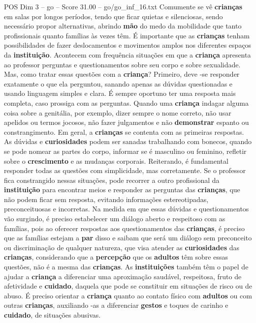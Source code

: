 \begin{textsample}{POS Dim 3 – go – Score 31.00 – go/go\_inf\_16.txt}
Comumente se vê \textbf{crianças} em salas por longos períodos, tendo que ficar quietas e silenciosas, sendo necessário propor alternativas, abrindo \textbf{mão} do medo da mobilidade que tanto profissionais quanto famílias às vezes têm.
É importante que as \textbf{crianças} tenham possibilidades de fazer deslocamentos e movimentos amplos nos diferentes espaços da \textbf{instituição}.
Acontecem com frequência situações em que a \textbf{criança} apresenta ao professor perguntas e questionamentos sobre seu corpo e sobre sexualidade.
Mas, como tratar essas questões com a \textbf{criança}?
Primeiro, deve -se responder exatamente o que ela perguntou, sanando apenas as dúvidas questionadas e usando linguagem simples e clara.
É sempre oportuno ter uma resposta mais completa, caso prossiga com as perguntas.
Quando uma \textbf{criança} indagar alguma coisa sobre a genitália, por exemplo, dizer sempre o nome correto, não usar apelidos ou termos jocosos, não fazer julgamentos e não \textbf{demonstrar} espanto ou constrangimento.
Em geral, a \textbf{crianças} se contenta com as primeiras respostas.
As dúvidas e \textbf{curiosidades} podem ser sanadas trabalhando com bonecos, quando se pode nomear as partes do corpo, informar se é masculino ou feminino, refletir sobre o \textbf{crescimento} e as mudanças corporais.
Reiterando, é fundamental responder todas as questões com simplicidade, mas corretamente.
Se o professor fica constrangido nessas situações, pode recorrer a outro profissional da \textbf{instituição} para encontrar meios e responder as perguntas das \textbf{crianças}, que não podem ficar sem resposta, evitando informações estereotipadas, preconceituosas e incorretas.
Na medida em que essas dúvidas e questionamentos vão surgindo, é preciso estabelecer um diálogo aberto e respeitoso com as famílias, pois ao oferecer respostas aos questionamentos das \textbf{crianças}, é preciso que as famílias estejam a \textbf{par} disso e saibam que será um diálogo sem preconceito ou discriminação de qualquer natureza, que visa atender as \textbf{curiosidades} das \textbf{crianças}, considerando que a \textbf{percepção} que os \textbf{adultos} têm sobre essas questões, não é a mesma das \textbf{crianças}.
As \textbf{instituições} também têm o papel de ajudar a \textbf{criança} a diferenciar uma aproximação saudável, respeitosa, fruto de afetividade e \textbf{cuidado}, daquela que pode se constituir em situações de risco ou de abuso.
É preciso orientar a \textbf{criança} quanto ao contato físico com \textbf{adultos} ou com outras \textbf{crianças}, auxiliando -as a diferenciar \textbf{gestos} e toques de carinho e \textbf{cuidado}, de situações abusivas.

\end{textsample}
